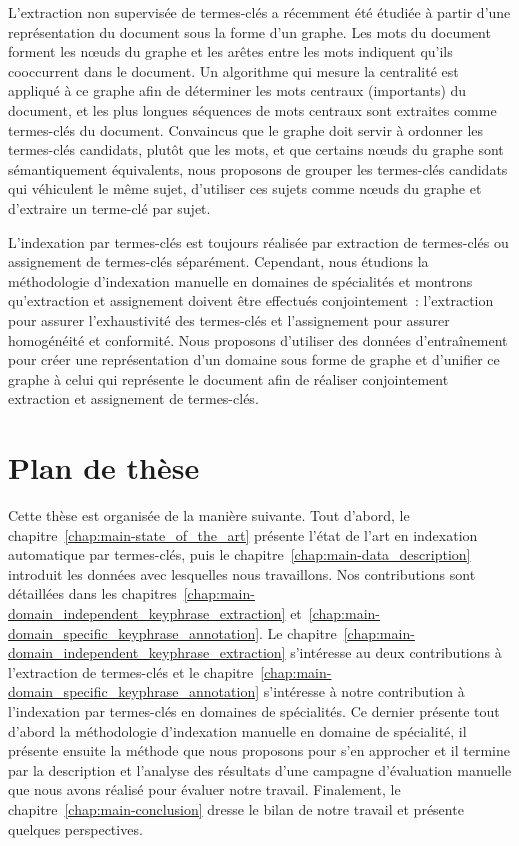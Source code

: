     L'extraction non supervisée de termes-clés a récemment été étudiée à partir
    d'une représentation du document sous la forme d'un graphe. Les mots du
    document forment les n\oe{}uds du graphe et les arêtes entre les mots
    indiquent qu'ils cooccurrent dans le document. Un algorithme qui mesure la
    centralité est appliqué à ce graphe afin de déterminer les mots centraux
    (importants) du document, et les plus longues séquences de mots centraux
    sont extraites comme termes-clés du document. Convaincus que le graphe doit
    servir à ordonner les termes-clés candidats, plutôt que les mots, et que
    certains n\oe{}uds du graphe sont sémantiquement équivalents, nous proposons
    de grouper les termes-clés candidats qui véhiculent le même sujet,
    d'utiliser ces sujets comme n\oe{}uds du graphe et d'extraire un terme-clé
    par sujet.
    
    L'indexation par termes-clés est toujours réalisée par extraction de
    termes-clés ou assignement de termes-clés séparément. Cependant, nous
    étudions la méthodologie d'indexation manuelle en domaines de spécialités et
    montrons qu'extraction et assignement doivent être effectués conjointement~:
    l'extraction pour assurer l'exhaustivité des termes-clés et l'assignement
    pour assurer homogénéité et conformité. Nous proposons d'utiliser des
    données d'entraînement pour créer une représentation d'un domaine sous forme
    de graphe et d'unifier ce graphe à celui qui représente le document afin de
    réaliser conjointement extraction et assignement de termes-clés.


  \section{Plan de thèse}
  \label{sec:main-introduction-outline}
    Cette thèse est organisée de la manière suivante. Tout d'abord, le
    chapitre~\ref{chap:main-state_of_the_art} présente l'état de l'art en
    indexation automatique par termes-clés, puis le
    chapitre~\ref{chap:main-data_description} introduit les données avec
    lesquelles nous travaillons. Nos contributions sont détaillées dans les
    chapitres~\ref{chap:main-domain_independent_keyphrase_extraction}
    et~\ref{chap:main-domain_specific_keyphrase_annotation}. Le
    chapitre~\ref{chap:main-domain_independent_keyphrase_extraction} s'intéresse
    au deux contributions à l'extraction de termes-clés et le
    chapitre~\ref{chap:main-domain_specific_keyphrase_annotation} s'intéresse à
    notre contribution à l'indexation par termes-clés en domaines de
    spécialités. Ce dernier présente tout d'abord la méthodologie d'indexation
    manuelle en domaine de spécialité, il présente ensuite la méthode que nous
    proposons pour s'en approcher et il termine par la description et l'analyse
    des résultats d'une campagne d'évaluation manuelle que nous avons réalisé
    pour évaluer notre travail. Finalement, le
    chapitre~\ref{chap:main-conclusion} dresse le bilan de notre travail et
    présente quelques perspectives.

